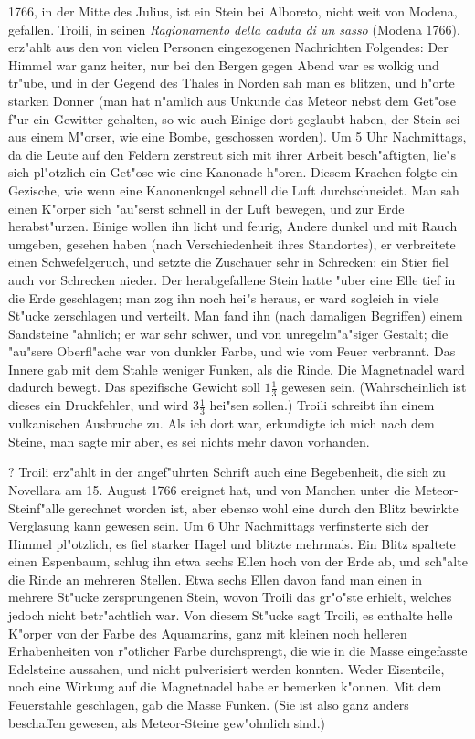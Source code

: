 \documentclass[a4paper, 11pt, oneside, polutonikogreek, german]{article}
\begin{document}
1766, in der Mitte des Julius, ist ein Stein bei Alboreto, nicht weit von Modena, gefallen. Troili, in seinen \emph{Ragionamento della caduta di un sasso} (Modena 1766), erz"ahlt aus den von vielen Personen eingezogenen Nachrichten Folgendes: Der Himmel war ganz heiter, nur bei den Bergen gegen Abend war es wolkig und tr"ube, und in der Gegend des Thales in Norden sah man es blitzen, und h"orte starken Donner (man hat n"amlich aus Unkunde das Meteor nebst dem Get"ose f"ur ein Gewitter gehalten, so wie auch Einige dort geglaubt haben, der Stein sei aus einem M"orser, wie eine Bombe, geschossen worden). Um 5 Uhr Nachmittags, da die Leute auf den Feldern zerstreut sich mit ihrer Arbeit besch"aftigten, lie"s sich pl"otzlich ein Get"ose wie eine Kanonade h"oren. Diesem Krachen folgte ein Gezische, wie wenn eine Kanonenkugel schnell die Luft durchschneidet. Man sah einen K"orper sich "au"serst schnell in der Luft bewegen, und zur Erde herabst"urzen. Einige wollen ihn licht und feurig, Andere dunkel und mit Rauch umgeben, gesehen haben (nach Verschiedenheit ihres Standortes), er verbreitete einen Schwefelgeruch, und setzte die Zuschauer sehr in Schrecken; ein Stier fiel auch vor Schrecken nieder. Der herabgefallene Stein hatte "uber eine Elle tief in die Erde geschlagen; man zog ihn noch hei"s heraus, er ward sogleich in viele St"ucke zerschlagen und verteilt. Man fand ihn (nach damaligen Begriffen) einem Sandsteine "ahnlich; er war sehr schwer, und von unregelm"a"siger Gestalt; die "au"sere Oberfl"ache war von dunkler Farbe, und wie vom Feuer verbrannt. Das Innere gab mit dem Stahle weniger Funken, als die Rinde. Die Magnetnadel ward dadurch bewegt. Das spezifische Gewicht soll $\mathfrak{1\frac{1}{3}}$ gewesen sein. (Wahrscheinlich ist dieses ein Druckfehler, und wird $\mathfrak{3\frac{1}{3}}$ hei"sen sollen.) Troili schreibt ihn einem vulkanischen Ausbruche zu. Als ich dort war, erkundigte ich mich nach dem Steine, man sagte mir aber, es sei nichts mehr davon vorhanden.

? Troili erz"ahlt in der angef"uhrten Schrift auch eine Begebenheit, die sich zu Novellara am 15. August 1766 ereignet hat, und von Manchen unter die Meteor-Steinf"alle gerechnet worden ist, aber ebenso wohl eine durch den Blitz bewirkte Verglasung kann gewesen sein. Um 6 Uhr Nachmittags verfinsterte sich der Himmel pl"otzlich, es fiel starker Hagel und blitzte mehrmals. Ein Blitz spaltete einen Espenbaum, schlug ihn etwa sechs Ellen hoch von der Erde ab, und sch"alte die Rinde an mehreren Stellen. Etwa sechs Ellen davon fand man einen in mehrere St"ucke zersprungenen Stein, wovon Troili das gr"o"ste erhielt, welches jedoch nicht betr"achtlich war. Von diesem St"ucke sagt Troili, es enthalte helle K"orper von der Farbe des Aquamarins, ganz mit kleinen noch helleren Erhabenheiten von r"otlicher Farbe durchsprengt, die wie in die Masse eingefasste Edelsteine aussahen, und nicht pulverisiert werden konnten. Weder Eisenteile, noch eine Wirkung auf die Magnetnadel habe er bemerken k"onnen. Mit dem Feuerstahle geschlagen, gab die Masse Funken. (Sie ist also ganz anders beschaffen gewesen, als Meteor-Steine gew"ohnlich sind.)
\end{document}
